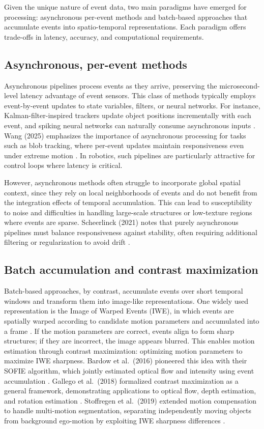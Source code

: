 Given the unique nature of event data, two main paradigms have emerged for processing: asynchronous per-event methods and batch-based approaches that accumulate events into spatio-temporal representations. Each paradigm offers trade-offs in latency, accuracy, and computational requirements.

\subsection{Asynchronous, per-event methods}
Asynchronous pipelines process events as they arrive, preserving the microsecond-level latency advantage of event sensors. This class of methods typically employs event-by-event updates to state variables, filters, or neural networks. For instance, Kalman-filter-inspired trackers update object positions incrementally with each event, and spiking neural networks can naturally consume asynchronous inputs \cite{Maqueda2018Steering}. Wang (2025) emphasizes the importance of asynchronous processing for tasks such as blob tracking, where per-event updates maintain responsiveness even under extreme motion \cite{Wang2025Thesis}. In robotics, such pipelines are particularly attractive for control loops where latency is critical.

However, asynchronous methods often struggle to incorporate global spatial context, since they rely on local neighborhoods of events and do not benefit from the integration effects of temporal accumulation. This can lead to susceptibility to noise and difficulties in handling large-scale structures or low-texture regions where events are sparse. Scheerlinck (2021) notes that purely asynchronous pipelines must balance responsiveness against stability, often requiring additional filtering or regularization to avoid drift \cite{Scheerlinck2021Thesis}.

\subsection{Batch accumulation and contrast maximization}
Batch-based approaches, by contrast, accumulate events over short temporal windows and transform them into image-like representations. One widely used representation is the Image of Warped Events (IWE), in which events are spatially warped according to candidate motion parameters and accumulated into a frame \cite{Gallego2018CMax}. If the motion parameters are correct, events align to form sharp structures; if they are incorrect, the image appears blurred. This enables motion estimation through contrast maximization: optimizing motion parameters to maximize IWE sharpness. Bardow et al.\ (2016) pioneered this idea with their SOFIE algorithm, which jointly estimated optical flow and intensity using event accumulation \cite{Bardow2016SOFIE}. Gallego et al.\ (2018) formalized contrast maximization as a general framework, demonstrating applications to optical flow, depth estimation, and rotation estimation \cite{Gallego2018CMax}. Stoffregen et al.\ (2019) extended motion compensation to handle multi-motion segmentation, separating independently moving objects from background ego-motion by exploiting IWE sharpness differences \cite{Stoffregen2019Segmentation}.

